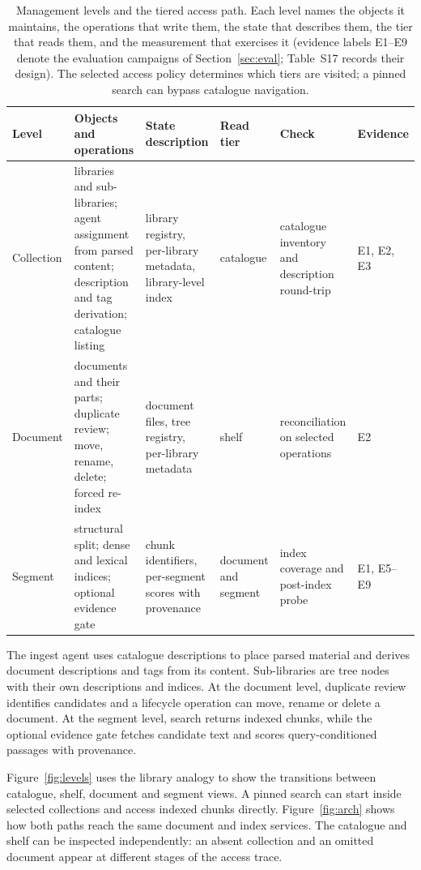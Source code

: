 \begin{table}[t]
\centering
\small
\setlength{\tabcolsep}{4pt}
\renewcommand{\arraystretch}{1.15}
\caption{Management levels and the tiered access path. Each level names the
objects it maintains, the operations that write them, the state that describes
them, the tier that reads them, and the measurement that exercises it
(evidence labels E1--E9 denote the evaluation campaigns of
Section~\ref{sec:eval}; Table~S17 records their design). The selected access
policy determines which tiers are visited; a pinned
search can bypass catalogue navigation.}
\label{tab:levels}
\begin{tabular}{@{}>{\raggedright\arraybackslash}p{}>{\raggedright\arraybackslash}p{}>{\raggedright\arraybackslash}p{}>{\raggedright\arraybackslash}p{}>{\raggedright\arraybackslash}p{}>{\raggedright\arraybackslash}p{}@{}}
\toprule
Level & Objects and operations & State description & Read tier & Check & Evidence\\
\midrule
Collection & libraries and sub-libraries; agent assignment from parsed content; description and tag derivation; catalogue listing & library registry, per-library metadata, library-level index & catalogue & catalogue inventory and description round-trip & E1, E2, E3\\
Document & documents and their parts; duplicate review; move, rename, delete; forced re-index & document files, tree registry, per-library metadata & shelf & reconciliation on selected operations & E2\\
Segment & structural split; dense and lexical indices; optional evidence gate & chunk identifiers, per-segment scores with provenance & document and segment & index coverage and post-index probe & E1, E5--E9\\
\bottomrule
\end{tabular}
\end{table}

The ingest agent uses catalogue descriptions to place parsed material and
derives document descriptions and tags from its content. Sub-libraries are
tree nodes with their own descriptions and indices. At the document level,
duplicate review identifies candidates and a lifecycle operation can move,
rename or delete a document. At the segment level, search returns indexed
chunks, while the optional evidence gate fetches candidate text and scores
query-conditioned passages with provenance.

Figure~\ref{fig:levels} uses the library analogy to show the transitions
between catalogue, shelf, document and segment views. A pinned search can
start inside selected collections and access indexed chunks directly.
Figure~\ref{fig:arch} shows how both paths reach the same document and
index services. The catalogue and shelf can be inspected independently:
an absent collection and an omitted document appear at different stages
of the access trace.

